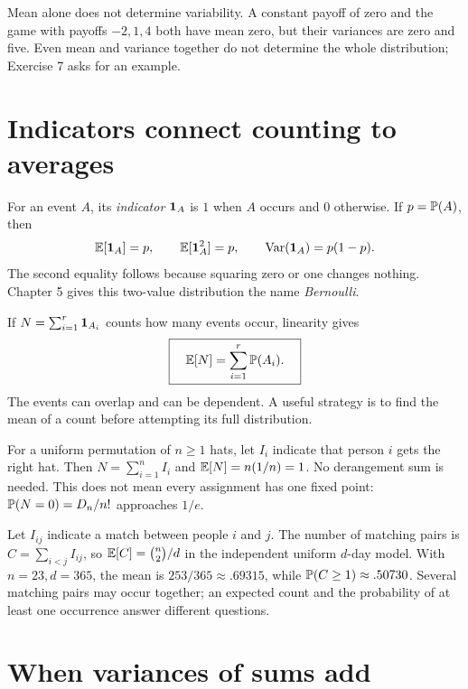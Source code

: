 Mean alone does not determine variability. A constant payoff of zero
and the game with payoffs $-2,1,4$ both have mean zero, but their variances
are zero and five. Even mean and variance together do not determine the
whole distribution; Exercise 7 asks for an example.

\section{Indicators connect counting to averages}
\label{sec:discrete-indicators}

For an event $A$, its \emph{indicator} $\ind_A$ is $1$ when $A$ occurs
and $0$ otherwise. If $p=\P(A)$, then
\[
 \E[\ind_A]=p,\qquad
 \E[\ind_A^2]=p,\qquad
 \Var(\ind_A)=p(1-p).
\]
The second equality follows because squaring zero or one changes nothing.
Chapter 5 gives this two-value distribution the name \emph{Bernoulli}.

If $N=\sum_{i=1}^r\ind_{A_i}$ counts how many events occur, linearity gives
\[
 \boxed{\quad \E[N]=\sum_{i=1}^r\P(A_i).\quad}
\]
The events can overlap and can be dependent. A useful strategy is to
find the mean of a count before attempting its full distribution.

\begin{example}
For a uniform permutation of $n\ge1$ hats, let $I_i$ indicate that
person $i$ gets the right hat. Then $N=\sum_{i=1}^n I_i$ and
$\E[N]=n(1/n)=1$. No derangement sum is needed.
This does not mean every assignment has one fixed point:
$\P(N=0)=D_n/n!$ approaches $1/e$.
\end{example}

\begin{example}
Let $I_{ij}$ indicate a match between people $i$ and $j$.
The number of matching pairs is $C=\sum_{i<j}I_{ij}$, so
$\E[C]=\binom n2/d$ in the independent uniform $d$-day model.
With $n=23,d=365$, the mean is $253/365\approx.69315$, while
$\P(C\ge1)\approx.50730$.
Several matching pairs may occur together; an expected count and the
probability of at least one occurrence answer different questions.
\end{example}



\section{When variances of sums add}
\label{sec:variance-sums}

